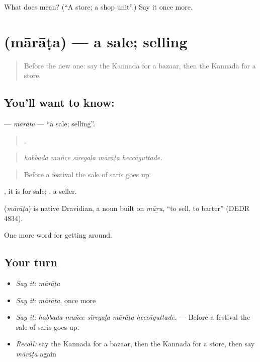 \begin{tcolorbox}[breakable,colback=teal!4,colframe=teal!35!black,title={Before you move on}]
What does  mean? (\textquotedblleft{}A store; a shop unit\textquotedblright{}.) Say it once more.
\end{tcolorbox}
\section[\texorpdfstring{\kn{ಮಾರಾಟ} (mārāṭa)}{ಮಾರಾಟ (mārāṭa)}]{ (mārāṭa) — a sale; selling}

\label{lesson:KA-C467-marata}



\begin{quote}
Before the new one: say the Kannada for a bazaar, then the Kannada for a store.
\end{quote}

\subsection*{You'll want to know: }
\textbf{} — \emph{mārāṭa} — \textquotedblleft{}a sale; selling\textquotedblright{}.

\begin{quote}
    .
\end{quote}

\begin{quote}
\emph{habbada muñce sīregaḷa mārāṭa heccāguttade.}
\end{quote}

\begin{quote}
Before a festival the sale of saris goes up.
\end{quote}

 , it is for sale; , a seller.

\begin{cousinweb}
\textbf{} (\emph{mārāṭa}) is native Dravidian, a noun built on \emph{māṟu}, \textquotedblleft{}to sell, to barter\textquotedblright{} (DEDR 4834).
\end{cousinweb}

\begin{grammarlens}[title={What you've built}]
One more word for getting around.
\end{grammarlens}

\subsection*{Your turn}
\begin{itemize}
\raggedright
  \item \emph{Say it:} \emph{mārāṭa}
  \item \emph{Say it:} \emph{mārāṭa}, once more
  \item \emph{Say it:} \emph{habbada muñce sīregaḷa mārāṭa heccāguttade.} — Before a festival the sale of saris goes up.
  \item \emph{Recall:} say the Kannada for a bazaar, then the Kannada for a store, then say \emph{mārāṭa} again
\end{itemize}

